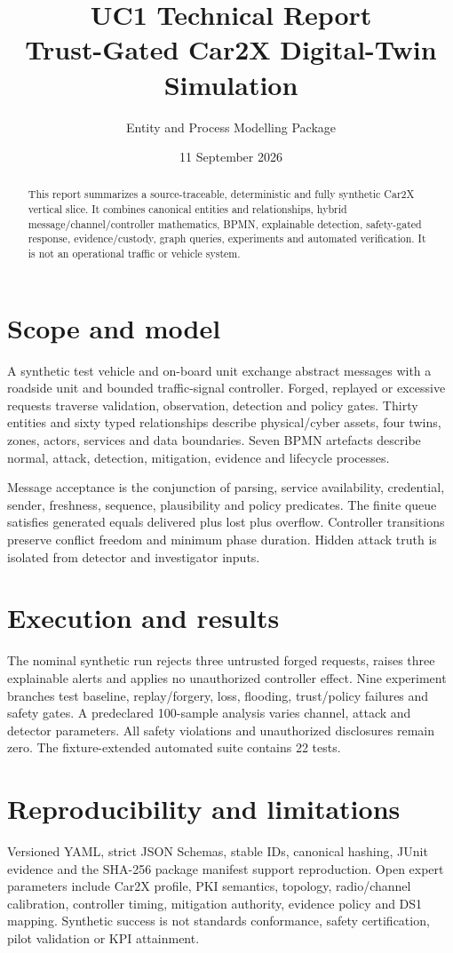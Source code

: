 \documentclass[11pt,a4paper]{article}
\title{UC1 Technical Report\\\large Trust-Gated Car2X Digital-Twin Simulation}
\author{Entity and Process Modelling Package}\date{11 September 2026}
\begin{document}
\maketitle
\begin{abstract}This report summarizes a source-traceable, deterministic and fully synthetic Car2X vertical slice. It combines canonical entities and relationships, hybrid message/channel/controller mathematics, BPMN, explainable detection, safety-gated response, evidence/custody, graph queries, experiments and automated verification. It is not an operational traffic or vehicle system.\end{abstract}
\section{Scope and model}
A synthetic test vehicle and on-board unit exchange abstract messages with a roadside unit and bounded traffic-signal controller. Forged, replayed or excessive requests traverse validation, observation, detection and policy gates. Thirty entities and sixty typed relationships describe physical/cyber assets, four twins, zones, actors, services and data boundaries. Seven BPMN artefacts describe normal, attack, detection, mitigation, evidence and lifecycle processes.

Message acceptance is the conjunction of parsing, service availability, credential, sender, freshness, sequence, plausibility and policy predicates. The finite queue satisfies generated equals delivered plus lost plus overflow. Controller transitions preserve conflict freedom and minimum phase duration. Hidden attack truth is isolated from detector and investigator inputs.
\section{Execution and results}
The nominal synthetic run rejects three untrusted forged requests, raises three explainable alerts and applies no unauthorized controller effect. Nine experiment branches test baseline, replay/forgery, loss, flooding, trust/policy failures and safety gates. A predeclared 100-sample analysis varies channel, attack and detector parameters. All safety violations and unauthorized disclosures remain zero. The fixture-extended automated suite contains 22 tests.
\section{Reproducibility and limitations}
Versioned YAML, strict JSON Schemas, stable IDs, canonical hashing, JUnit evidence and the SHA-256 package manifest support reproduction. Open expert parameters include Car2X profile, PKI semantics, topology, radio/channel calibration, controller timing, mitigation authority, evidence policy and DS1 mapping. Synthetic success is not standards conformance, safety certification, pilot validation or KPI attainment.
\end{document}
